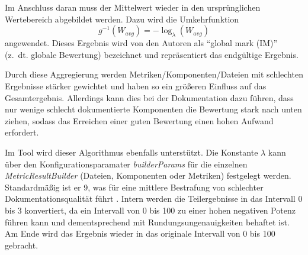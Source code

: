  Im Anschluss daran muss der Mittelwert wieder in den ursprünglichen Wertebereich abgebildet werden. Dazu wird die Umkehrfunktion
 \begin{equation}
     g^{-1}(W_{avg})=-\log_\lambda (W_{avg})
 \end{equation} angewendet. Dieses Ergebnis wird von den Autoren als \enquote{global mark (IM)} (z.~dt. globale Bewertung) bezeichnet und repräsentiert das endgültige Ergebnis.
 
 Durch diese Aggregierung werden Metriken/Komponenten/Dateien mit schlechten Ergebnisse stärker gewichtet und haben so ein größeren Einfluss auf das Gesamtergebnis. Allerdings kann dies bei der Dokumentation dazu führen, dass nur wenige schlecht dokumentierte Komponenten die Bewertung stark nach unten ziehen, sodass das Erreichen einer guten Bewertung einen hohen Aufwand erfordert. 
 
 Im Tool wird dieser Algorithmus ebenfalls unterstützt. Die Konstante $\lambda$ kann über den Konfigurationsparamater \textit{builderParams} für die einzelnen \textit{MetricResultBuilder} (Dateien, Komponenten oder Metriken) festgelegt werden. Standardmäßig ist er 9, was für eine mittlere Bestrafung von schlechter Dokumentationsqualität führt \cite[S. 1127]{Softwarequalitymetricsaggregationinindustry}. Intern werden die Teilergebnisse in das Intervall 0 bis 3 konvertiert, da ein Intervall von 0 bis 100 zu einer hohen negativen Potenz führen kann und dementsprechend mit Rundungsungenauigkeiten behaftet ist. Am Ende wird das Ergebnis wieder in das originale Intervall von 0 bis 100 gebracht. 
 
 
 

 
 
